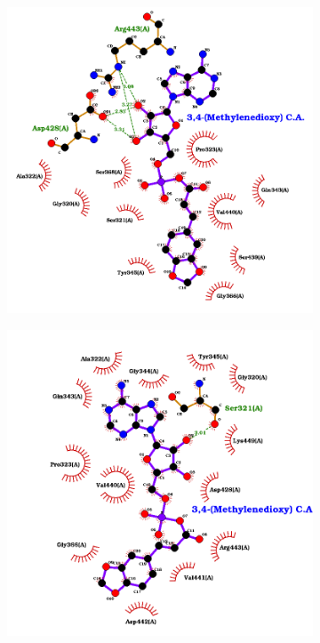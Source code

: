\documentclass[12pt]{article}
\begin{document}
	\newpage
	
	\FloatBarrier
	\begin{figure}[h!]
		\centering
		\begin{subfigure}[h!]{0.35\textwidth}
			\hspace{2cm}
			\includegraphics[width=\textwidth]{../6/known/Dock/best.png}
			\caption{}
		\end{subfigure}
		\hfill
		\begin{subfigure}[h!]{0.35\textwidth}
			\hspace{-2cm}
			\includegraphics[width=\textwidth]{../6/known/Dock/best2.png}

\end{subfigure}
\end{figure}
\end{document}
